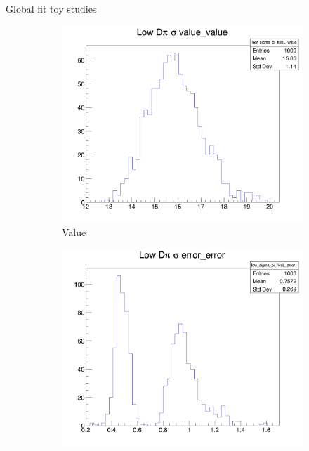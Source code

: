 \documentclass{beamer}
\begin{document}
\begin{frame}{Global fit toy studies}
  \begin{figure}
    \centering
    \vspace{-0.2cm}
    \begin{subfigure}{0.33\textwidth}
      \includegraphics[width = 1.0\textwidth]{Plots/low_sigma_pi_fiveL_value.png}
      \caption{Value}
    \end{subfigure}%
    \begin{subfigure}{0.33\textwidth}
      \includegraphics[width = 1.0\textwidth]{Plots/low_sigma_pi_fiveL_error.png}

\end{subfigure}
\end{figure}
\end{frame}
\end{document}
